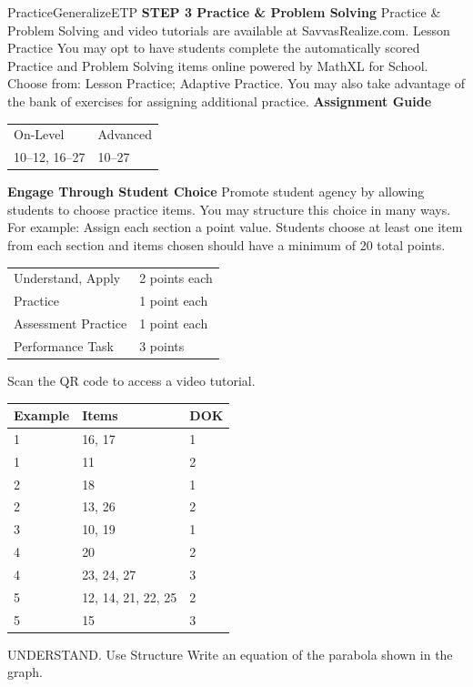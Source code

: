\documentclass{article}
\newenvironment{item-analysis}{}{}      %
\newenvironment{practice}[2]{}{}        %
\newenvironment{te-addendum}[2]{}{}     %
\newcommand{\answer}[1]{}               %
\newcommand{\placeholder}[2]{}          %
\begin{document}
\begin{te-addendum}{Practice}{GeneralizeETP}
\textbf{STEP 3 Practice & Problem Solving}
Practice & Problem Solving and video tutorials are available at SavvasRealize.com.
Lesson Practice You may opt to have students complete the automatically scored Practice and Problem Solving items online powered by MathXL for School.
Choose from: Lesson Practice; Adaptive Practice.
You may also take advantage of the bank of exercises for assigning additional practice.
\textbf{Assignment Guide}
\begin{tabular}{ll}
On-Level & Advanced \\
10--12, 16--27 & 10--27 \\
\end{tabular}
\textbf{Engage Through Student Choice}
Promote student agency by allowing students to choose practice items. You may structure this choice in many ways.
For example:
Assign each section a point value. Students choose at least one item from each section and items chosen should have a minimum of 20 total points.
\begin{tabular}{ll}
Understand, Apply & 2 points each \\
Practice & 1 point each \\
Assessment Practice & 1 point each \\
Performance Task & 3 points \\
\end{tabular}
Scan the QR code to access a video tutorial.
\end{te-addendum}
\begin{item-analysis}
\begin{tabular}{lll}
\toprule
Example & Items & DOK \\
\midrule
1 & 16, 17 & 1 \\
1 & 11 & 2 \\
2 & 18 & 1 \\
2 & 13, 26 & 2 \\
3 & 10, 19 & 1 \\
4 & 20 & 2 \\
4 & 23, 24, 27 & 3 \\
5 & 12, 14, 21, 22, 25 & 2 \\
5 & 15 & 3 \\
\bottomrule
\end{tabular}
\end{item-analysis}
\begin{practice}{10}{1}
UNDERSTAND. Use Structure Write an equation of the parabola shown in the graph.
\placeholder{graph}{Unit grid with x and y axes, O at origin, window [-5,5] on both axes, labels -4,-2,2,4, black double-arrow axes. Red upward-opening parabola y=x^2/16 with vertex (0,0) and arrowheads at ends near (-5,1.56) and (5,1.56); red filled focus (0,4) labeled F.}
\answer{(y=\frac{1}{16}x^2)}
\end{practice}
\end{document}
